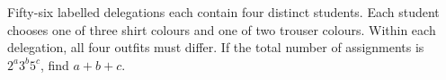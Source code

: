 Fifty-six labelled delegations each contain four distinct students. Each student chooses one of three shirt colours and one of two trouser colours. Within each delegation, all four outfits must differ. If the total number of assignments is $2^a3^b5^c$, find $a+b+c$.
